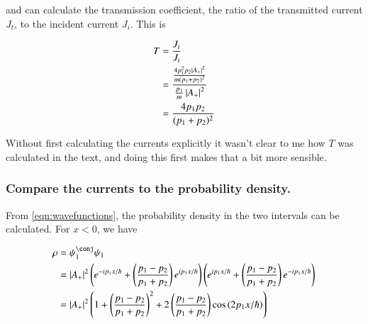 \documentclass{article}
\begin{document}
and can calculate the transmission coefficient, the ratio of the transmitted current $J_t$, to the incident current $J_i$.  This is

\begin{align*}
T
&= \frac{J_t}{J_i} \\
&=
\frac{
\frac{ 4 p_1^2 p_2 \left\lvert{ A_{+} }\right\rvert^2}{m (p_1 + p_2)^2}
}
{
\frac{ p_1}{m} \left\lvert{ A_{+} }\right\rvert^2
} \\
&=
\frac{ 4 p_1 p_2 }{ (p_1 + p_2)^2}
\end{align*}

Without first calculating the currents explicitly it wasn't clear to me how $T$ was calculated in the text, and doing this first
makes that a bit more sensible.

\subsubsection{Compare the currents to the probability density. }

From \ref{eqn:wavefunctions}, the probability density in the two intervals
can be calculated.  For $x<0$, we have

\begin{align*}
\rho
&= \psi_1^\conj \psi_1 \\
&=
\Abs{ A_{+} }^2
\left(
e^{ -i p_1 x/\hbar }
+\left( \frac{ p_1 - p_2 }{p_1 + p_2} \right) e^{ i p_1 x/\hbar }
\right)
\left(
e^{ i p_1 x/\hbar }
+\left( \frac{ p_1 - p_2 }{p_1 + p_2} \right) e^{ -i p_1 x/\hbar }
\right)
\\
&=
\Abs{ A_{+} }^2
\left(
1
+
\left( \frac{ p_1 - p_2 }{p_1 + p_2} \right)^2
+
2 \left( \frac{ p_1 - p_2 }{p_1 + p_2} \right) \cos\left( 2 p_1 x/\hbar \right)
\right) \\
\end{align*}
\end{document}

